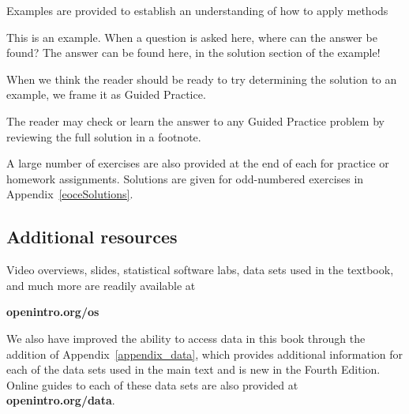 \noindent%
Examples are provided to establish an understanding of how
to apply methods

\begin{examplewrap}
\begin{nexample}{This is an example.
    When a question is asked here, where can the answer be found?}
  The answer can be found here, in the solution section
  of the example!
\end{nexample}
\end{examplewrap}

\noindent%
When we think the reader should be ready to try determining
the solution to an example, we frame it as Guided Practice.

\begin{exercisewrap}
\begin{nexercise}
The reader may check or learn the answer to any Guided Practice
problem by reviewing the full solution in a footnote.\footnotemark{}
\end{nexercise}
\end{exercisewrap}

\noindent%
A large number of exercises are also provided at the end
of each  for practice
or homework assignments.
Solutions are given for odd-numbered exercises in
Appendix~\ref{eoceSolutions}.


\subsection*{Additional resources}

Video overviews, slides, statistical software labs,
data sets used in the textbook,
and much more are readily available at\\[-5mm]
\begin{center}
    {\color{black}\textbf{openintro.org/os}}
\end{center}
We also have improved the ability to access data in this book
through the addition of Appendix~\ref{appendix_data},
which provides additional information for each of the data sets
used in the main text and is new in the Fourth Edition.
Online guides to each of these data sets are also provided at
    {\color{black}\textbf{openintro.org/data}}. \vspace{3mm}

